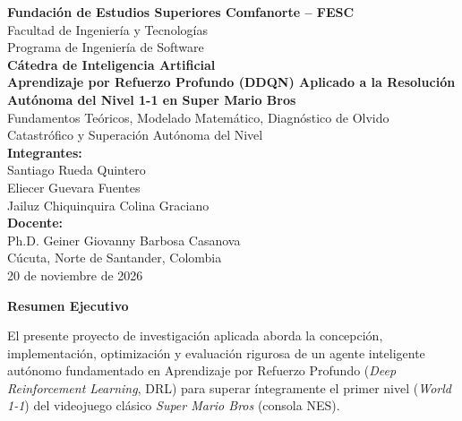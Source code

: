 \documentclass[11pt,letterpaper]{article}
\begin{document}
\begin{titlepage}
\centering
\vspace*{0.5cm}
{\Large\bfseries Fundación de Estudios Superiores Comfanorte -- FESC}\\[0.4cm]
{\large Facultad de Ingeniería y Tecnologías}\\[0.2cm]
{\large Programa de Ingeniería de Software}\\[0.3cm]
{\large\textbf{Cátedra de Inteligencia Artificial}}\\[1.4cm]

{\LARGE\bfseries Aprendizaje por Refuerzo Profundo (DDQN) Aplicado a la Resolución Autónoma del Nivel 1-1 en Super Mario Bros}\\[0.6cm]

{\large Fundamentos Teóricos, Modelado Matemático, Diagnóstico de Olvido Catastrófico y Superación Autónoma del Nivel}\\[1.6cm]

\textbf{\large Integrantes:}\\[0.2cm]
{\normalsize Santiago Rueda Quintero}\\[0.1cm]
{\normalsize Eliecer Guevara Fuentes}\\[0.1cm]
{\normalsize Jailuz Chiquinquira Colina Graciano}\\[1.2cm]

\textbf{\large Docente:}\\[0.2cm]
{\normalsize Ph.D. Geiner Giovanny Barbosa Casanova}\\[1.6cm]

\vfill
{\normalsize Cúcuta, Norte de Santander, Colombia\\ 20 de noviembre de 2026}
\end{titlepage}

\newpage
\begin{center}
    {\Large\bfseries Resumen Ejecutivo}\\[0.8cm]
\end{center}

El presente proyecto de investigación aplicada aborda la concepción, implementación, optimización y evaluación rigurosa de un agente inteligente autónomo fundamentado en Aprendizaje por Refuerzo Profundo (\textit{Deep Reinforcement Learning}, DRL) para superar íntegramente el primer nivel (\textit{World 1-1}) del videojuego clásico \textit{Super Mario Bros} (consola NES). 
\end{document}

